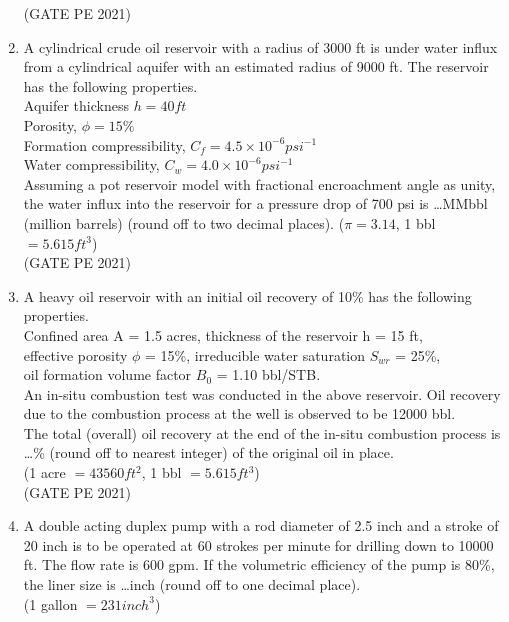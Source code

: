\documentclass[journal,12pt,onecolumn]{IEEEtran}
\theoremstyle{remark}
\begin{document}
\begin{enumerate}
\hfill{(GATE PE 2021)}

\item A cylindrical crude oil reservoir with a radius of 3000 ft is under water influx from a cylindrical aquifer with an estimated radius of 9000 ft. The reservoir has the following properties.\\
Aquifer thickness $h=40ft$\\
Porosity, $\phi=15\%$\\
Formation compressibility, $C_f=4.5\times 10^{-6}psi^{-1}$\\
Water compressibility, $C_w=4.0\times10^{-6}psi^{-1}$\\
Assuming a pot reservoir model with fractional encroachment angle as unity, the water influx into the reservoir for a pressure drop of 700 psi is \dots MMbbl (million barrels) (round off to two decimal places).
($\pi=3.14$, 1 bbl $=5.615ft^3$)\\

\hfill{(GATE PE 2021)}

\item A heavy oil reservoir with an initial oil recovery of 10\% has the following properties.\\
Confined area A = 1.5 acres, thickness of the reservoir h = 15 ft,\\
effective porosity $\phi$ = 15\%, irreducible water saturation $S_{wr}$ = 25\%,\\
oil formation volume factor $B_0$ = 1.10 bbl/STB.\\
An in-situ combustion test was conducted in the above reservoir. Oil recovery due to the combustion process at the well is observed to be 12000 bbl.\\
The total (overall) oil recovery at the end of the in-situ combustion process is \dots\% (round off to nearest integer) of the original oil in place.\\

(1 acre $=43560ft^2$, 1 bbl $=5.615ft^3$)\\

\hfill{(GATE PE 2021)}

\item A double acting duplex pump with a rod diameter of 2.5 inch and a stroke of 20 inch is to be operated at 60 strokes per minute for drilling down to 10000 ft. The flow rate is 600 gpm. If the volumetric efficiency of the pump is 80\%, the liner size is \dots inch (round off to one decimal place).\\
(1 gallon $=231inch^3$)\\


\end{enumerate}
\end{document}
